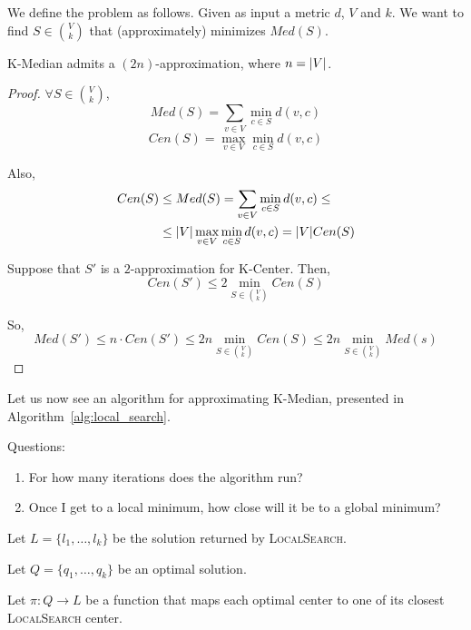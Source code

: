     We define the problem as follows.
    Given as input a metric $d$, $V$ and $k$.
    We want to find $S \in \binom{V}{k}$ that (approximately) minimizes $Med(S)$.

    \begin{observation}
        K-Median admits a $(2n)$-approximation, where $n = \vert V \vert$.
    \end{observation}

    \begin{proof}
        $\forall S \in \binom{V}{k}$,
        \[ Med(S) = \sum_{v \in V} \min_{c \in S} d(v,c) \]
        \[ Cen(S) = \max_{v \in V} \min_{c \in S} d(v,c) \]

        Also,
        \begin{equation*}
            \begin{split}
                Cen(S) &\leq Med(S) = \sum_{v \in V} \min_{c \in S} d(v,c) \leq\\
                    &\leq \vert V \vert \max_{v \in V} \min_{c \in S} d(v,c) = \vert V \vert Cen(S)
            \end{split}
        \end{equation*}

        Suppose that $S'$ is a $2$-approximation for K-Center.
        Then,
        \[ Cen(S') \leq 2 \min_{S \in \binom{V}{k}} Cen(S) \]

        So,
        \[ Med(S') \leq n \cdot Cen(S') \leq 2n \min_{S \in \binom{V}{k}} Cen(S) \leq 2n \min_{S \in \binom{V}{k}} Med(s)  \]
    \end{proof}

    Let us now see an algorithm for approximating K-Median, presented in Algorithm~\ref{alg:local_search}.

    

    Questions:
    \begin{enumerate}
        \item For how many iterations does the algorithm run?
        \item Once I get to a local minimum, how close will it be to a global minimum?
    \end{enumerate}

    Let $L = \{ l_1, \dots, l_k \}$ be the solution returned by \textsc{LocalSearch}.

    Let $Q = \{q_1, \dots, q_k\}$ be an optimal solution.

    Let $\pi : Q \rightarrow L$ be a function that maps each optimal center to one of its closest \textsc{LocalSearch} center.


